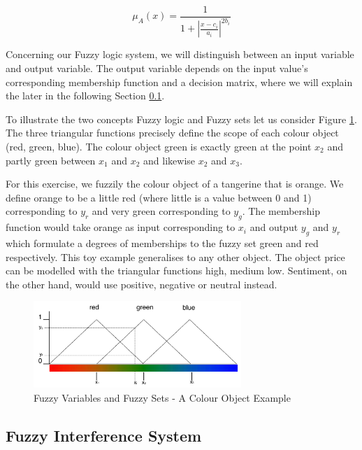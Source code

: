 \begin{equation} \label{eq:gaus}
\mu_A(x) =  \frac{1}{ 1 + |\frac{x- c_i }{a_i}|^{2b_i}  }\end{equation}


Concerning our Fuzzy logic system, we will distinguish between an input variable and output variable. The output variable depends on the input value's corresponding membership function and a decision matrix, where we will explain the later in the following Section \ref{fis}. 

 To illustrate the two concepts Fuzzy logic and Fuzzy sets let us consider Figure \ref{fig:fuzz_example}. The three triangular functions precisely define the scope of each colour object (red, green, blue). The colour object green is exactly green at the point $x_2$ and partly green between $x_1$ and $x_2$ and likewise $x_2$ and $x_3$. 
 
For this exercise, we fuzzily the colour object of a tangerine that is orange.  We define orange to be a little red (where little is a value between 0 and 1) corresponding to $y_r$ and very green corresponding to $y_g$.  The membership function would take orange as input corresponding to $x_i$ and output $y_g$ and $y_r$ which formulate a degrees of memberships to the fuzzy set green and red respectively. This toy example generalises to any other object. The object price can be modelled with the triangular functions high, medium low. Sentiment, on the other hand, would use positive, negative or neutral instead. 




\begin{figure}[H]
        \centering
         \includegraphics[width=0.7\textwidth ]{img/model/fuzz_example}
              
        \caption{Fuzzy Variables and Fuzzy Sets - A Colour Object Example}
        \label{fig:fuzz_example}
\end{figure}



\subsection{Fuzzy Interference System}
\label{fis}


